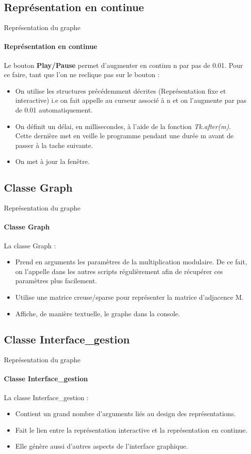 \documentclass{beamer}
\begin{document}
\subsection{Représentation en continue}
\begin{frame}{Représentation du graphe}
\framesubtitle{Représentation en continue}
Le bouton \textbf{Play/Pause} permet d'augmenter en continu n par pas de 0.01. Pour ce faire, tant que l'on ne reclique pas sur le bouton :  
\begin{itemize}
\item On utilise les structures précédemment décrites (Représentation fixe et interactive) i.e on fait appelle au curseur associé à n et on l'augmente par pas de 0.01 automatiquement.
\item On définit un délai, en millisecondes, à l'aide de la fonction \textit{Tk.after(m)}. Cette dernière met en veille le programme  pendant une durée m avant de passer à la tache suivante.
\item On met à jour la fenêtre.
\end{itemize} 
\end{frame}

\subsection{Classe Graph}
\begin{frame}{Représentation du graphe}
\framesubtitle{Classe Graph}
La classe Graph :
\begin{itemize}
\item Prend en arguments les paramètres de la multiplication modulaire. De ce fait, on l'appelle dans les autres scripts régulièrement afin de récupérer ces paramètres plus facilement.
\item Utilise une matrice creuse/sparse pour représenter la matrice d'adjacence M.
\item Affiche, de manière textuelle, le graphe dans la console.
\end{itemize}
\end{frame}

\subsection{Classe Interface\_gestion}
\begin{frame}{Représentation du graphe}
\framesubtitle{Classe Interface\_gestion}
La classe Interface\_gestion : 
\begin{itemize}
\item Contient un grand nombre d'arguments liés au design des représentations.
\item Fait le lien entre la représentation interactive et la représentation en continue.
\item Elle génère aussi d'autres aspects de l'interface graphique. 
\end{itemize}
\end{frame}
\end{document}
